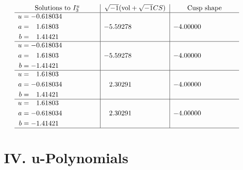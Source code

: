 \documentclass[1p]{elsarticle_modified}
\theoremstyle{definition}
\newcommand{\I}{\sqrt{-1}}
\begin{document}
$$\begin{array}{c|c|c}  
\text{Solutions to }I^u_{3}& \I (\text{vol} + \sqrt{-1}CS) & \text{Cusp shape}\\
 \hline 
\begin{aligned}
u &= -0.618034\phantom{ +0.000000I} \\
a &= \phantom{-}1.61803\phantom{ +0.000000I} \\
b &= \phantom{-}1.41421\phantom{ +0.000000I}\end{aligned}
 & -5.59278\phantom{ +0.000000I} & -4.00000\phantom{ +0.000000I} \\ \hline\begin{aligned}
u &= -0.618034\phantom{ +0.000000I} \\
a &= \phantom{-}1.61803\phantom{ +0.000000I} \\
b &= -1.41421\phantom{ +0.000000I}\end{aligned}
 & -5.59278\phantom{ +0.000000I} & -4.00000\phantom{ +0.000000I} \\ \hline\begin{aligned}
u &= \phantom{-}1.61803\phantom{ +0.000000I} \\
a &= -0.618034\phantom{ +0.000000I} \\
b &= \phantom{-}1.41421\phantom{ +0.000000I}\end{aligned}
 & \phantom{-}2.30291\phantom{ +0.000000I} & -4.00000\phantom{ +0.000000I} \\ \hline\begin{aligned}
u &= \phantom{-}1.61803\phantom{ +0.000000I} \\
a &= -0.618034\phantom{ +0.000000I} \\
b &= -1.41421\phantom{ +0.000000I}\end{aligned}
 & \phantom{-}2.30291\phantom{ +0.000000I} & -4.00000\phantom{ +0.000000I}\\
 \hline 
 \end{array}$$\newpage
\newpage\renewcommand{\arraystretch}{1}
\centering \section*{ IV. u-Polynomials}
\end{document}
